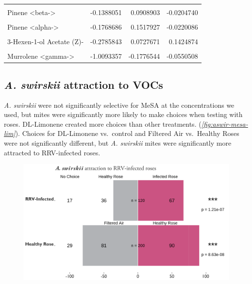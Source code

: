 \documentclass[12pt,final,CPage]{ufthesis}
\begin{document}
{\begin{table}
{\begin{tabular}[t]{lrrr}
  \cellcolor{gray!6}{Methyl Salicylate} & \cellcolor{gray!6}{-0.1230488} & \cellcolor{gray!6}{0.0195828} & \cellcolor{gray!6}{0.2451660}\\
  \addlinespace
  Pinene <beta-> & -0.1388051 & 0.0908903 & -0.0204740\\
  \cellcolor{gray!6}{Farnesene <(E,E)-, alpha->} & \cellcolor{gray!6}{-0.1703874} & \cellcolor{gray!6}{0.0430163} & \cellcolor{gray!6}{0.0170290}\\
  Pinene <alpha-> & -0.1768686 & 0.1517927 & -0.0220086\\
  \cellcolor{gray!6}{Ocimene, <beta->} & \cellcolor{gray!6}{-0.2027449} & \cellcolor{gray!6}{0.1639320} & \cellcolor{gray!6}{-0.0248480}\\
  3-Hexen-1-ol Acetate (Z)- & -0.2785843 & 0.0727671 & 0.1424874\\
  \addlinespace
  \cellcolor{gray!6}{Caryophyllene <beta->} & \cellcolor{gray!6}{-0.3896566} & \cellcolor{gray!6}{0.1118965} & \cellcolor{gray!6}{-0.0339373}\\
  Murrolene <gamma-> & -1.0093357 & -0.1776544 & -0.0550508\\
  \bottomrule
  \end{tabular}}
  \end{table}
  \hypertarget{results-olfact}{%
  \subsection{\texorpdfstring{\emph{A. swirskii} attraction to VOCs}{A. swirskii attraction to VOCs}}\label{results-olfact}}

  \emph{A. swirskii} were not significantly selective for MeSA at the concentrations we used, but mites were significantly more likely to make choices when testing with roses. DL-Limonene created more choices than other treatments. (\emph{\ref{fig:aswir-mesa-lim}}). Choices for DL-Limonene vs.~control and Filtered Air vs.~Healthy Roses were not significantly different, but \emph{A. swirskii} mites were significantly more attracted to RRV-infected roses.
  \begin{figure}

  {\centering \includegraphics[width=1\linewidth]{figure/rrv_graph_olfact_rose} 

}
\end{figure}}
\end{document}
